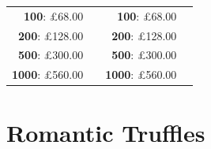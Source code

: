 \documentclass[11pt, english]{article}
\begin{document}
\begin{table}[h]
\begin{center}
\begin{tabular}{r|p{4cm}r|p{4cm}}
		\textbf{100}: \pounds68.00 & & \textbf{100}: \pounds68.00 & \\
		\textbf{200}: \pounds128.00 & & \textbf{200}: \pounds128.00 & \\
		\textbf{500}: \pounds300.00 & & \textbf{500}: \pounds300.00 & \\
		\textbf{1000}: \pounds560.00 & & \textbf{1000}: \pounds560.00 & \\
	\end{tabular}
	\end{center}
	\end{table}

	\vspace{1cm}

\section{Romantic Truffles}
\end{document}
